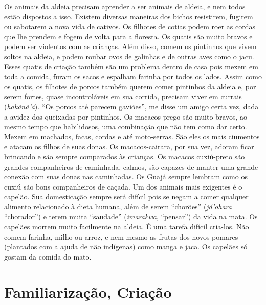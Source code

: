 Os animais da aldeia precisam aprender a ser animais de aldeia, e nem
todos estão dispostos a isso. Existem diversas maneiras dos bichos
resistirem, fugirem ou sabotarem a nova vida de cativos. Os filhotes de
cotias podem roer as cordas que lhe prendem e fogem de volta para a
floresta. Os quatis são muito bravos e podem ser violentos com as
crianças. Além disso, comem os pintinhos que vivem soltos na aldeia, e
podem roubar ovos de galinhas e de outras aves como o jacu. Esses quatis
de criação também são um problema dentro de casa pois mexem em toda a
comida, furam os sacos e espalham farinha por todos os lados. Assim como
os quatis, os filhotes de porcos também querem comer pintinhos da aldeia
e, por serem fortes, quase incontroláveis em sua corrida, precisam viver
em currais (\emph{hakãnã'ã}). ``Os porcos até parecem gaviões'', me
disse um amigo certa vez, dada a avidez dos queixadas por pintinhos. Os
macacos-prego são muito bravos, ao mesmo tempo que habilidosos, uma
combinação que não tem como dar certo. Mexem em machados, facas, cordas
e até moto-serras. São eles os mais ciumentos e atacam os filhos de suas
donas. Os macacos-cairara, por sua vez, adoram ficar brincando e são
sempre comparados às crianças. Os macacos cuxiú-preto são grandes
companheiros de caminhada, calmos, são capazes de manter uma grande
conexão com suas donas nas caminhadas. Os Guajá sempre lembram como os
cuxiú são bons companheiros de caçada. Um dos animais mais exigentes é o
capelão. Sua domesticação sempre será difícil pois se negam a comer
qualquer alimento relacionado à dieta humana, além de serem ``chorões''
(\emph{já'ohara} ``chorador'') e terem muita ``saudade''
(\emph{imarakwa}, ``pensar'') da vida na mata. Os capelães morrem muito
facilmente na aldeia. É uma tarefa difícil cria-los. Não comem farinha,
milho ou arroz, e nem mesmo as frutas dos novos pomares (plantados com a
ajuda de não indígenas) como manga e jaca. Os capelães só gostam da
comida do mato.

\section{Familiarização, Criação}


